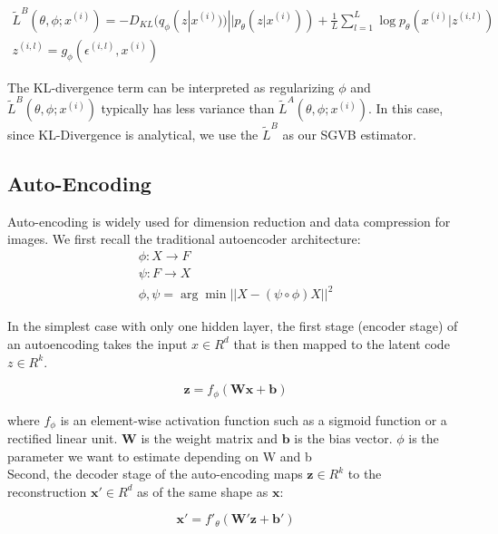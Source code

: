 \documentclass[11pt]{article}
\begin{document}
\begin{eqnarray}
\widetilde{L}^B(\theta, \phi; x^{(i)})=-D_{KL}(q_\phi(z|x^{(i)}))||p_\theta(z|x^{(i)}))+\frac{1}{L}\sum^L_{l=1}\log p_\theta (x^{(i)}|z^{(i, l)})\\
z^{(i,l)}=g_\phi (\epsilon^{(i, l)}, x^{(i)})
\end{eqnarray}

\noindent
The KL-divergence term can be interpreted as regularizing $\phi$ and $\widetilde{L}^B(\theta, \phi; x^{(i)})$ typically has less variance than $\widetilde{L}^A(\theta, \phi; x^{(i)})$. In this case, since KL-Divergence is analytical, we use the $\widetilde{L}^B$ as our SGVB estimator. 

\subsection{Auto-Encoding}

\noindent
Auto-encoding is widely used for dimension reduction and data compression for images. We first recall the traditional autoencoder architecture:
\begin{eqnarray}
\phi: X\to F \\
\psi: F\to X \\
\phi, \psi = \arg\min||X-(\psi\circ\phi) X||^2
\end{eqnarray}

\noindent
In the simplest case with only one hidden layer, the first stage (encoder stage) of an autoencoding takes the input $x \in R^d$ that is then mapped to the latent code $z \in R^k$.

\begin{equation}
\mathbf{z}=f_{\phi}(\mathbf{Wx}+\mathbf{b})
\end{equation}

where $f_{\phi}$ is an element-wise activation function such as a sigmoid function or a rectified linear unit. $\mathbf {W}$ is the weight matrix and $\mathbf {b}$ is the bias vector. $\phi$ is the parameter we want to estimate depending on W and b\\ 

\vspace{3mm}
Second, the decoder stage of the auto-encoding maps $\mathbf {z} \in R^k$ to the reconstruction $\mathbf {x'} \in R^d $ as of the same shape as $\mathbf{x}$:

\begin{equation}
\mathbf{x'}=f'_{\theta}(\mathbf{W'z}+\mathbf{b'})
\end{equation}
\end{document}
